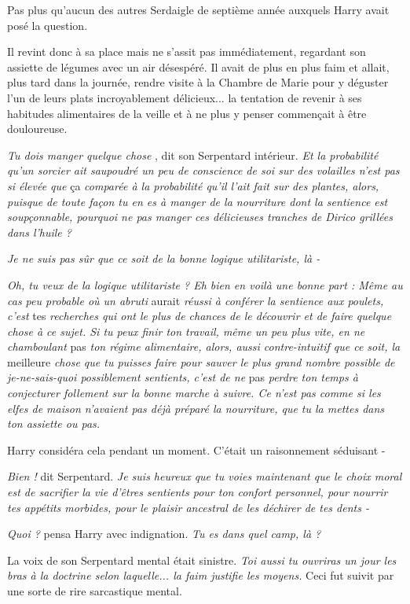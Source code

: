 Pas plus qu'aucun des autres Serdaigle de septième année auxquels Harry avait posé la question.

Il revint donc à sa place mais ne s'assit pas immédiatement, regardant son assiette de légumes avec un air désespéré. Il avait de plus en plus faim et allait, plus tard dans la journée, rendre visite à la Chambre de Marie pour y déguster l'un de leurs plats incroyablement délicieux... la tentation de revenir à ses habitudes alimentaires de la veille et à ne plus y penser commençait à être douloureuse.

\emph{Tu dois manger quelque chose} , dit son Serpentard intérieur. \emph{Et la probabilité qu'un sorcier ait saupoudré un peu de conscience de soi sur des volailles n'est pas si élevée que } ça \emph{comparée à la probabilité qu'il l'ait fait sur des plantes, alors, puisque de toute façon tu en es à manger de la nourriture dont la sentience est soupçonnable, pourquoi ne pas manger ces délicieuses tranches de Dirico grillées dans l'huile ?} 

\emph{Je ne suis pas sûr que ce soit de la bonne logique utilitariste, là -} 

\emph{Oh, tu veux de la logique utilitariste ? Eh bien en voilà une bonne part : Même au cas peu probable où un abruti } aurait\emph{ réussi à conférer la sentience aux poulets, c'est } tes\emph{ recherches qui ont le plus de chances de le découvrir et de faire quelque chose à ce sujet. Si tu peux finir ton travail, même un peu plus vite, en ne chamboulant } pas\emph{ ton régime alimentaire, alors, aussi contre-intuitif que ce soit, la } meilleure\emph{ chose que tu puisses faire pour sauver le plus grand nombre possible de je-ne-sais-quoi possiblement sentients, c'est de ne } pas\emph{ perdre ton temps à conjecturer follement sur la bonne marche à suivre. Ce n'est pas comme si les elfes de maison n'avaient pas déjà préparé la nourriture, que tu la mettes dans ton assiette ou pas.} 

Harry considéra cela pendant un moment. C'était un raisonnement séduisant -

\emph{Bien ! } dit Serpentard. \emph{Je suis heureux que tu voies maintenant que le choix moral est de sacrifier la vie d'êtres sentients pour ton confort personnel, pour nourrir tes appétits morbides, pour le plaisir ancestral de les déchirer de tes dents -} 

\emph{Quoi ? } pensa Harry avec indignation. \emph{Tu es dans quel camp, là ?} 

La voix de son Serpentard mental était sinistre. \emph{Toi aussi tu ouvriras un jour les bras à la doctrine selon laquelle... la faim justifie les moyens. } Ceci fut suivit par une sorte de rire sarcastique mental.

